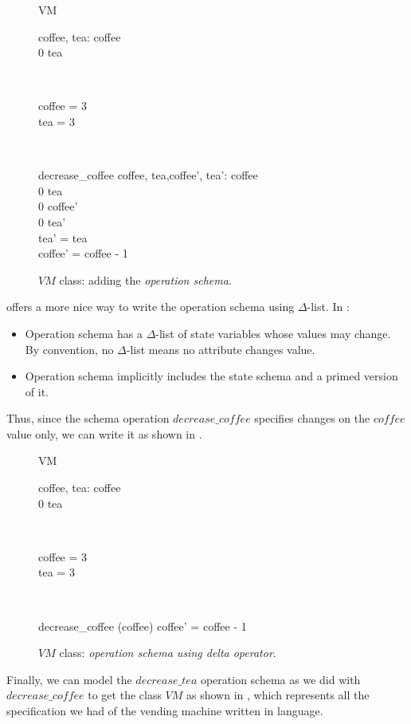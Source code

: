 \begin{itemize}
\begin{itemize}
\end{itemize}
\begin{figure}[H]
\centering
\begin{class}{VM}
\\
\begin{state}
coffee, tea: \integer
{} \leq  coffee 
\\
0 \leq  tea 
\end{state} 
\\
\begin{init}
coffee = 3
\\tea = 3
\end{init} 
\\
\begin{op}{decrease\_coffee}
coffee, tea,coffee', tea': \integer
{} \leq  coffee 
\\
0 \leq  tea 
\\
0 \leq  coffee' 
\\
0 \leq  tea' 
\\
tea' = tea
\\
coffee' = coffee - 1
\end{op}
\end{class}
\caption{$VM$ class: adding the \textit{operation schema}.}
\label{oz_VM_op}
\end{figure}
\oz{} offers a more nice way to write the operation schema using $\Delta$-list. In \oz{}:
\begin{itemize}
\item Operation schema has a $\Delta$-list of state variables
whose values may change. By convention, no $\Delta$-list means
no attribute changes value.
\item Operation schema implicitly
includes the state schema and a primed version of it.
\end{itemize}
Thus, since the schema operation $decrease\_coffee$ specifies changes on the $coffee$ value only, we can write it as shown in . 
\begin{figure}[H]
\centering
\begin{class}{VM}
\\
\begin{state}
coffee, tea: \integer
{} \leq  coffee 
\\
0 \leq  tea 
\end{state} 
\\
\begin{init}
coffee = 3
\\tea = 3
\end{init} 
\\
\begin{op}{decrease\_coffee}
\Delta (coffee)
\ST
coffee' = coffee - 1
\end{op}
\end{class}
\caption{$VM$ class: \textit{operation schema using delta operator}.}
\label{oz_VM_op_delta}
\end{figure}
Finally, we can model the $decrease\_tea$ operation schema as we did with $decrease\_coffee$ to get the class $VM$ as shown in , which represents all the specification we had of the vending machine written in \oz{} language.


\end{itemize}
